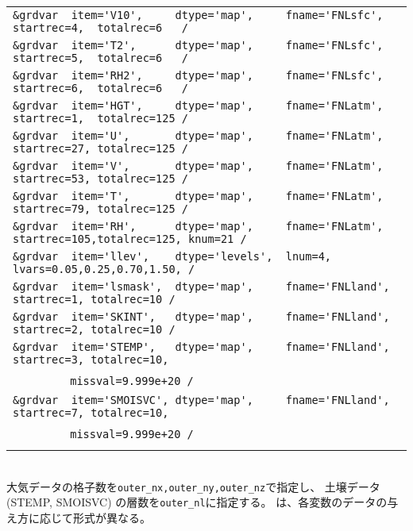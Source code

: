 {{{\begin{tabularx}{150mm}{l}
\verb|&grdvar  item='V10',     dtype='map',     fname='FNLsfc', startrec=4,  totalrec=6   / |  \\
\verb|&grdvar  item='T2',      dtype='map',     fname='FNLsfc', startrec=5,  totalrec=6   / |  \\
\verb|&grdvar  item='RH2',     dtype='map',     fname='FNLsfc', startrec=6,  totalrec=6   / |  \\
\verb|&grdvar  item='HGT',     dtype='map',     fname='FNLatm', startrec=1,  totalrec=125 / |  \\
\verb|&grdvar  item='U',       dtype='map',     fname='FNLatm', startrec=27, totalrec=125 / |  \\
\verb|&grdvar  item='V',       dtype='map',     fname='FNLatm', startrec=53, totalrec=125 / |  \\
\verb|&grdvar  item='T',       dtype='map',     fname='FNLatm', startrec=79, totalrec=125 / |  \\ 
\verb|&grdvar  item='RH',      dtype='map',     fname='FNLatm', startrec=105,totalrec=125, knum=21 /  |  \\
\verb|&grdvar  item='llev',    dtype='levels',  lnum=4, lvars=0.05,0.25,0.70,1.50, /        |  \\
\verb|&grdvar  item='lsmask',  dtype='map',     fname='FNLland', startrec=1, totalrec=10 /  |  \\
\verb|&grdvar  item='SKINT',   dtype='map',     fname='FNLland', startrec=2, totalrec=10 /  |  \\
\verb|&grdvar  item='STEMP',   dtype='map',     fname='FNLland', startrec=3, totalrec=10,|\\
~~~~~~~~\verb| missval=9.999e+20 /|  \\ 
\verb|&grdvar  item='SMOISVC', dtype='map',     fname='FNLland', startrec=7, totalrec=10,|\\
~~~~~~~~\verb| missval=9.999e+20 /|  \\ 
\\
\end{tabularx}
}}}\\


大気データの格子数を\verb|outer_nx,outer_ny,outer_nz|で指定し、
土壌データ(STEMP, SMOISVC) の層数を\verb|outer_nl|に指定する。
は、各変数のデータの与え方に応じて形式が異なる。\\

